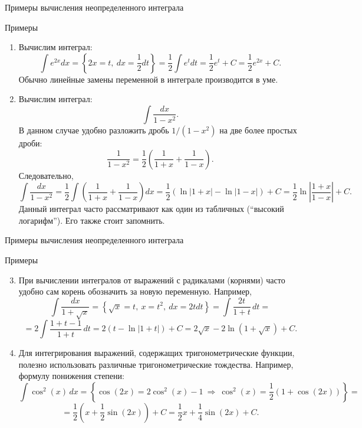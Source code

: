 \documentclass[8pt]{beamer}
\begin{document}
\begin{frame}{Примеры вычисления неопределенного интеграла}
\begin{block}{Примеры}
\begin{enumerate}
\item Вычислим интеграл:
$$\int e^{2x}dx =\left\{ 2x =t,\ dx=\frac{1}{2} dt \right\} = \frac{1}{2} \int e^{t}dt = \frac{1}{2}e^t+C = \frac{1}{2}e^{2x}+C.$$
Обычно линейные замены переменной в интеграле производится в уме.
\item Вычислим интеграл:
$$\int \frac{dx}{1-x^2}.$$
В данном случае удобно разложить дробь $1/(1-x^2)$ на две более простых дроби:
$$\frac{1}{1-x^2} = \frac{1}{2}\left( \frac{1}{1+x}+\frac{1}{1-x}\right).$$
Следовательно,
$$\int \frac{dx}{1-x^2} = \frac{1}{2}\int \left( \frac{1}{1+x}+\frac{1}{1-x}\right) dx=
\frac{1}{2}\left(\ln|1+x| - \ln|1-x|\right)+C = \frac{1}{2}\ln\left|\frac{1+x}{1-x}\right|+C.$$
Данный интеграл часто рассматривают как один из табличных (``высокий логарифм''). Его также стоит запомнить.
\end{enumerate}
\end{block}
\end{frame}

\begin{frame}{Примеры вычисления неопределенного интеграла}
\begin{block}{Примеры}
\begin{enumerate}
\setcounter{enumi}{2}
\item При вычислении интегралов от выражений с радикалами (корнями) часто удобно сам корень обозначить за новую переменную. Например,
$$\int \frac{dx}{1+\sqrt{x}} = \left\{ \sqrt{x} =t,\ x=t^2,\ dx = 2tdt \right\} =
\int \frac{2t}{1+t}\,dt =$$
$$=2\int \frac{1+t -1}{1+t}\,dt=2\left(t-\ln|1+t|\right)+C = 2\sqrt{x}-2\ln(1+\sqrt{x})+C.$$
\item Для интегрирования выражений, содержащих тригонометрические функции, полезно использовать различные тригонометрические тождества. Например, формулу понижения степени:
$$\int\cos^2(x)\,dx =  \left\{ \cos(2x) = 2\cos^2(x)-1\ \Rightarrow\ \cos^2(x) = \frac{1}{2}(1+\cos(2x))\right\}=$$
$$=\frac{1}{2}\left(x+\frac{1}{2}\sin(2x)\right)+C=\frac{1}{2}x+\frac{1}{4}\sin(2x)+C.
$$
\end{enumerate}
\end{block}
\end{frame}
\end{document}

